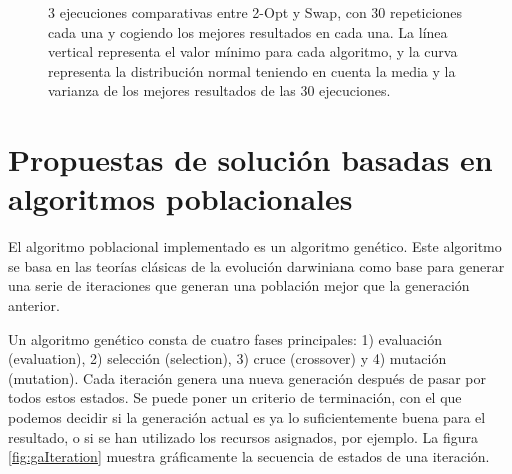 \documentclass[10pt,a4paper]{article}
\begin{document}
\begin{figure}[!htb]
\endminipage
\caption{3 ejecuciones comparativas entre 2-Opt y Swap, con 30 repeticiones cada una y cogiendo los mejores resultados en cada una. La línea vertical representa el valor mínimo para cada algoritmo, y la curva representa la distribución normal teniendo en cuenta la media y la varianza de los mejores resultados de las 30 ejecuciones.}
\label{fig:optSwapComparison}
\end{figure}


\section{Propuestas de solución basadas en algoritmos poblacionales}
El algoritmo poblacional implementado es un algoritmo genético. Este algoritmo se basa en las teorías clásicas de la evolución darwiniana como base para generar una serie de iteraciones que generan una población mejor que la generación anterior.

Un algoritmo genético consta de cuatro fases principales: 1) evaluación (evaluation), 2) selección (selection), 3) cruce (crossover) y 4) mutación (mutation). Cada iteración genera una nueva generación después de pasar por todos estos estados. Se puede poner un criterio de terminación, con el que podemos decidir si la generación actual es ya lo suficientemente buena para el resultado, o si se han utilizado los recursos asignados, por ejemplo. La figura \ref{fig:gaIteration} muestra gráficamente la secuencia de estados de una iteración.
\end{document}
